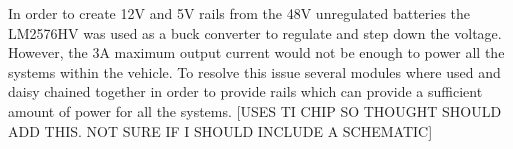 In order to create 12V and 5V rails from the 48V unregulated batteries the LM2576HV was used as a buck converter to regulate and step down the voltage. However, the 3A maximum output current would not be enough to power all the systems within the vehicle. To resolve this issue several modules where used and daisy chained together in order to provide rails which can provide a sufficient amount of power for all the systems. [USES TI CHIP SO THOUGHT SHOULD ADD THIS. NOT SURE IF I SHOULD INCLUDE A SCHEMATIC] 
